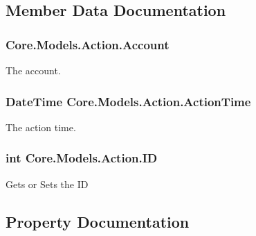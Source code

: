 \subsection{Member Data Documentation}
\hypertarget{classCore_1_1Models_1_1Action_a1924816082b3d1173ef309581a69ef95}{}
\subsubsection[{Account}]{ Core.\+Models.\+Action.\+Account}\label{classCore_1_1Models_1_1Action_a1924816082b3d1173ef309581a69ef95}


The account. 

\hypertarget{classCore_1_1Models_1_1Action_ab973fe9b8e3c6a60fa9d82cf53de57c3}{}
\subsubsection[{Action\+Time}]{\setlength{\rightskip}{0pt plus 5cm}Date\+Time Core.\+Models.\+Action.\+Action\+Time}\label{classCore_1_1Models_1_1Action_ab973fe9b8e3c6a60fa9d82cf53de57c3}


The action time. 

\hypertarget{classCore_1_1Models_1_1Action_a13671e1a48f3a462a366fe2768073816}{}
\subsubsection[{I\+D}]{\setlength{\rightskip}{0pt plus 5cm}int Core.\+Models.\+Action.\+I\+D}\label{classCore_1_1Models_1_1Action_a13671e1a48f3a462a366fe2768073816}


Gets or Sets the I\+D 



\subsection{Property Documentation}
\hypertarget{classCore_1_1Models_1_1Action_ae2defe30307109c1265b4cf16c001553}{}
